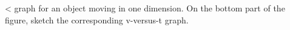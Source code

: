  <%
graph for an object moving in one dimension.  On the bottom
part of the figure, sketch the corresponding v-versus-t graph.
